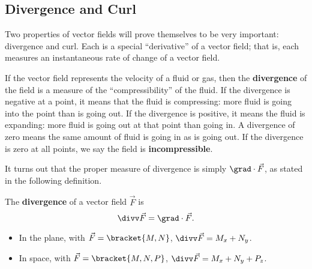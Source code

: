 \subsection{Divergence and Curl}

Two properties of vector fields will prove themselves to be very important: divergence and curl. Each is a special ``derivative'' of a vector field; that is, each measures an instantaneous rate of change of a vector field.

If the vector field represents the velocity of a fluid or gas, then the \textbf{divergence} of the field is a measure of the ``compressibility'' of the fluid. If the divergence is negative at a point, it means that the fluid is compressing: more fluid is going into the point than is going out. If the divergence is positive, it means the fluid is expanding: more fluid is going out at that point than going in. A divergence of zero means the same amount of fluid is going in as is going out. If the divergence is zero at all points, we say the field is \textbf{incompressible}.

It turns out that the proper measure of divergence is simply $\grad \cdot \vec F$, as stated in the following definition.

\begin{definition}\label{def:divergence}
The \textbf{divergence} of a vector field $\vec F$ is
\[\divv \vec F = \grad \cdot \vec F.\]
\begin{itemize}
	\item In the plane, with $\vec F =\bracket{M,N}$, $\divv \vec F = M_x+N_y$.
	\item	In space, with $\vec F =\bracket{M,N,P}$, $\divv \vec F = M_x+N_y+P_z$.
\end{itemize}
\end{definition}


